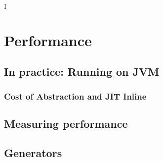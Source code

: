 I%

\chapter{Performance} %

\label{Performance} %



\section{In practice: Running on JVM}


\subsection{Cost of Abstraction and JIT Inline}



\section{Measuring performance}


\section{Generators}



